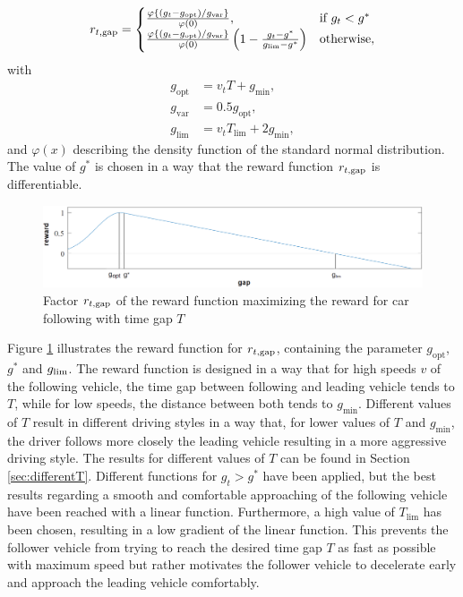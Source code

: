 \documentclass[review]{elsarticle}
\providecommand{\sub}[1]{_{\mathrm{#1}}}  %
\providecommand{\3}{{\ss}}
\begin{document}
	
	\begin{equation}
	\label{eq:r2_CFP}
	r_{t, \rm gap}  = 
	\begin{cases}
	\frac{\varphi\left\{(g_t-g\sub{opt})/g\sub{var}\right\}}{\varphi(0)}, & \text{if } g_t < g^*\\
	\frac{\varphi\left\{(g_t-g\sub{opt})/g\sub{var}\right\}}{\varphi(0)}\left(1-\frac{g_t-g^*}{g\sub{lim} - g^*}\right)  & \text{otherwise},
	\end{cases}
	\end{equation}
	with 
	\begin{align}
	g\sub{opt} &= v_tT + g\sub{min},\\
	g\sub{var} &= 0.5g\sub{opt},\\
	g\sub{lim} &= v_tT\sub{lim} + 2g\sub{min},
	\end{align}
	and $\varphi(x)$ describing the density function of the standard normal distribution. The value of $g^*$ is chosen in a way that the reward function $r_{t,\rm gap}$ is differentiable.
	\begin{figure}
		\centering
		\includegraphics[width=12cm]{images/RewardFunc1}
		\caption{Factor $r_{t, \rm gap}$ of the reward function maximizing the reward
			for car following with time gap $T$} 
		\label{fig:RewardFunc1}
	\end{figure}
	Figure \ref{fig:RewardFunc1} illustrates the reward function for
	$r_{t,\rm gap}$, containing the parameter $g\sub{opt}$, $g^*$ and $g_{\rm
		lim}$. The reward function is designed in a way that for high speeds $v$
	of the following vehicle, the time gap between following and leading
	vehicle tends to $T$, while for low speeds, the distance
	between both tends to $g\sub{min}$. Different values of $T$
	result in different driving styles in a way that, for lower values of
	$T$ and $g\sub{min}$, the driver follows
	more closely the leading vehicle resulting in a more aggressive
	driving style. The results for different values of $T$ can
	be found in Section \ref{sec:differentT}. Different functions for $g_t
	> g^*$ have been applied, but the best results regarding a smooth and
	comfortable approaching of the following vehicle have been reached with
	a linear function. Furthermore, a high value of $T\sub{lim}$ has been
	chosen, resulting in a low gradient of the linear function. This
	prevents the follower vehicle from trying to reach the desired time gap $T$
	as fast as possible with maximum speed but rather motivates the follower vehicle to decelerate early and approach the leading vehicle comfortably.
	
\end{document}
